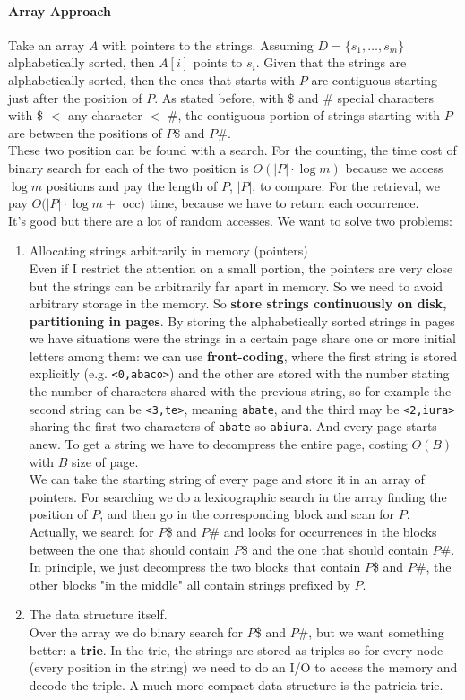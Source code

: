 \documentclass[10pt]{report}
\begin{document}
\paragraph{Array Approach} Take an array $A$ with pointers to the strings. Assuming $D=\{s_1,\ldots,s_m\}$ alphabetically sorted, then $A[i]$ points to $s_i$. Given that the strings are alphabetically sorted, then the ones that starts with $P$ are contiguous starting just after the position of $P$. As stated before, with \$ and \# special characters with \$ $<$ any character $<$ \#, the contiguous portion of strings starting with $P$ are between the positions of $P$\$ and $P$\#.\\
These two position can be found with a search. For the counting, the time cost of binary search for each of the two position is $O(|P|\cdot\log m)$ because we access $\log m$ positions and pay the length of $P$, $|P|$, to compare. For the retrieval, we pay $O(|P|\cdot\log m +$ occ$)$ time, because we have to return each occurrence.\\
It's good but there are a lot of random accesses. We want to solve two problems:
\begin{enumerate}
	\item Allocating strings arbitrarily in memory (pointers)\\
	Even if I restrict the attention on a small portion, the pointers are very close but the strings can be arbitrarily far apart in memory. So we need to avoid arbitrary storage in the memory. So \textbf{store strings continuously on disk, partitioning in pages}. By storing the alphabetically sorted strings in pages we have situations were the strings in a certain page share one or more initial letters among them: we can use \textbf{front-coding}, where the first string is stored explicitly (e.g. \texttt{<0,abaco>}) and the other are stored with the number stating the number of characters shared with the previous string, so for example the second string can be \texttt{<3,te>}, meaning \texttt{abate}, and the third may be \texttt{<2,iura>} sharing the first two characters of \texttt{abate} so \texttt{abiura}. And every page starts anew. To get a string we have to decompress the entire page, costing $O(B)$ with $B$ size of page.\\
	We can take the starting string of every page and store it in an array of pointers. For searching we do a lexicographic search in the array finding the position of $P$, and then go in the corresponding block and scan for $P$. Actually, we search for $P$\$ and $P$\# and looks for occurrences in the blocks between the one that should contain $P$\$ and the one that should contain $P$\#. In principle, we just decompress the two blocks that contain $P$\$ and $P$\#, the other blocks "in the middle" all contain strings prefixed by $P$.
	\item The data structure itself.\\
	Over the array we do binary search for $P$\$ and $P$\#, but we want something better: a \textbf{trie}. In the trie, the strings are stored as triples so for every node (every position in the string) we need to do an I/O to access the memory and decode the triple. A much more compact data structure is the patricia trie.
\end{enumerate}
\end{document}
